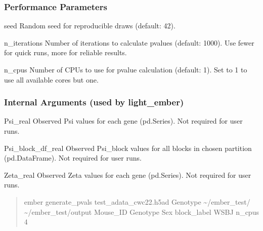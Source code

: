 \documentclass[letterpaper,10pt,english]{sphinxmanual}
\begin{document}
\subsubsection{Performance Parameters}
\label{\detokenize{cli:performance-parameters_repeat1}}\begin{optionlist}{3cm}
\item [\sphinxhyphen{}\sphinxhyphen{}seed]  
\sphinxAtStartPar
Random seed for reproducible draws (default: 42).
\item [\sphinxhyphen{}\sphinxhyphen{}n\_iterations]  
\sphinxAtStartPar
Number of iterations to calculate p\sphinxhyphen{}values (default: 1000). Use fewer for quick runs, more for reliable results.
\item [\sphinxhyphen{}\sphinxhyphen{}n\_cpus]  
\sphinxAtStartPar
Number of CPUs to use for p\sphinxhyphen{}value calculation (default: 1). Set to \sphinxhyphen{}1 to use all available cores but one.
\end{optionlist}


\subsubsection{Internal Arguments (used by light\_ember)}
\label{\detokenize{cli:internal-arguments-(used-by-light_ember)}}\begin{optionlist}{3cm}
\item [\sphinxhyphen{}\sphinxhyphen{}Psi\_real]  
\sphinxAtStartPar
Observed Psi values for each gene (pd.Series). Not required for user runs.
\item [\sphinxhyphen{}\sphinxhyphen{}Psi\_block\_df\_real]  
\sphinxAtStartPar
Observed Psi\_block values for all blocks in chosen partition (pd.DataFrame). Not required for user runs.
\item [\sphinxhyphen{}\sphinxhyphen{}Zeta\_real]  
\sphinxAtStartPar
Observed Zeta values for each gene (pd.Series). Not required for user runs.
\end{optionlist}
\begin{quote}
\begin{description}
\sphinxAtStartPar
ember generate\_pvals test\_adata\_cwc22.h5ad Genotype \textasciitilde{}/ember\_test/ \textasciitilde{}/ember\_test/output Mouse\_ID Genotype Sex \textendash{}block\_label WSBJ \textendash{}n\_cpus 4

\end{description}
\end{quote}
\end{document}
